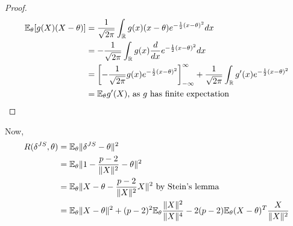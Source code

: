 \documentclass[a4paper]{article}
\begin{document}
\begin{proof}
	\begin{align*}
		\mathbb{E}_{\theta} [g(X)(X-\theta)] &= \frac{1}{\sqrt{2\pi} } \int_{\mathbb{R}} g(x)(x-\theta) e^{-\frac{1}{2} (x-\theta)^2} dx\\
			&= -\frac{1}{\sqrt{2\pi} } \int_{\mathbb{R}} g(x) \frac{d}{dx} e^{- \frac{1}{2} (x-\theta)^2} dx \\
			&= \left[ -\frac{1}{\sqrt{2\pi} } g(x) e^{- \frac{1}{2} (x-\theta)^2} \right]_{-\infty}^{\infty} + \frac{1}{\sqrt{2\pi} } \int_{\mathbb{R}} g'(x) e^{- \frac{1}{2} (x-\theta)^2}\\
			&= \mathbb{E}_{\theta} g'(X) \text{, as $g$ has finite expectation} 
	\end{align*}
\end{proof}

Now,
\begin{align*}
	R(\delta^{JS}, \theta) &= \mathbb{E}_{\theta} \|\delta^{JS} - \theta\|^2 \\
	&= \mathbb{E}_{\theta} \|1 - \frac{p-2}{ \|X\|^2} - \theta\|^2 \\
	&= \mathbb{E}_{\theta} \|X - \theta - \frac{p-2}{\|X\|^2}X\|^2 \text{ by Stein's lemma } \\
	&= \mathbb{E}_{\theta} \|X-\theta\|^2 + (p-2)^2\mathbb{E}_{\theta}\frac{\|X\|^2}{\|X\|^{4}} - 2(p-2) \mathbb{E}_{\theta} (X-\theta)^{T}\frac{X}{\|X\|^2}
\end{align*}
\end{document}
